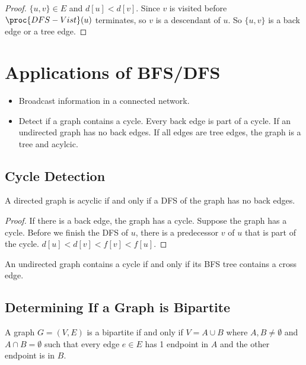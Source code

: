 \begin{proof}
    $\{u,v\} \in E$ and $d[u] < d[v]$. Since $v$ is visited before $\proc{DFS-Vist}(u)$ terminates, so $v$ is a descendant of $u$. So $\{u,v\}$ is a back edge or a tree edge.
\end{proof}

\section{Applications of BFS/DFS}

\begin{itemize}
    \item Broadcast information in a connected network.
    \item Detect if a graph contains a cycle. Every back edge is part of a cycle. If an undirected graph has no back edges. If all edges are tree edges, the graph is a tree and acylcic. 
\end{itemize}

\subsection{Cycle Detection}

\vspace{\parskip}

\begin{lemma}
    A directed graph is acyclic if and only if a DFS of the graph has no back edges.
\end{lemma}

\begin{proof}
    If there is a back edge, the graph has a cycle. Suppose the graph has a cycle. Before we finish the DFS of $u$, there is a predecessor $v$ of $u$ that is part of the cycle. $d[u] < d[v] < f[v] < f[u]$.
\end{proof}

\begin{lemma}
    An undirected graph contains a cycle if and only if its BFS tree contains a cross edge.
\end{lemma}

\subsection{Determining If a Graph is Bipartite}

\vspace{\parskip}

\begin{definition}
    A graph $G=(V,E)$ is a bipartite if and only if $V = A \cup B$ where $A,B \neq \emptyset$ and $A \cap B = \emptyset$ such that every edge $e \in E$ has 1 endpoint in $A$ and the other endpoint is in $B$. 
\end{definition}

